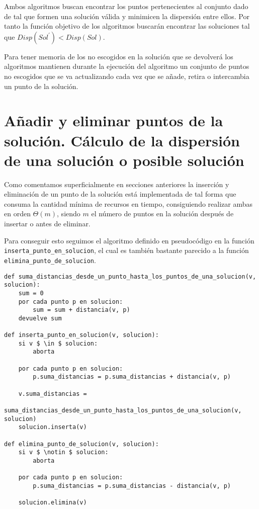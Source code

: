 Ambos algoritmos buscan encontrar los puntos pertenecientes al conjunto dado de tal que formen una solución válida y minimicen la dispersión
entre ellos. Por tanto la función objetivo de los algoritmos buscarán encontrar las soluciones tal que $ Disp(Sol^{\prime}) < Disp(Sol) $.

Para tener memoria de los no escogidos en la solución que se devolverá los algoritmos mantienen durante la ejecución del algoritmo un
conjunto de puntos no escogidos que se va actualizando cada vez que se añade, retira o intercambia un punto de la solución.

\section{Añadir y eliminar puntos de la solución. Cálculo de la dispersión de una solución o posible solución}

Como comentamos superficialmente en secciones anteriores la inserción y eliminación de un punto de la solución está implementada de tal
forma que consuma la cantidad mínima de recursos en tiempo, consiguiendo realizar ambas en orden $ \Theta(m) $, siendo $ m $ el 
número de puntos en la solución después de insertar o antes de eliminar.

Para conseguir esto seguimos el algoritmo definido en pseudocódigo en la función \texttt{inserta\_punto\_en\_solucion}, el cual es también bastante parecido
a la función \texttt{elimina\_punto\_de\_solucion}.

\begin{minipage}{\textwidth}
\begin{lstlisting}[mathescape=true,caption={Definición en pseudocódigo de las funciones que permiten añadir y eliminar puntos a una solución.},captionpos=b]
def suma_distancias_desde_un_punto_hasta_los_puntos_de_una_solucion(v, solucion):
    sum = 0
    por cada punto p en solucion:
        sum = sum + distancia(v, p)
    devuelve sum

def inserta_punto_en_solucion(v, solucion):
    si v $ \in $ solucion:
        aborta

    por cada punto p en solucion:
        p.suma_distancias = p.suma_distancias + distancia(v, p)
    
    v.suma_distancias =
        suma_distancias_desde_un_punto_hasta_los_puntos_de_una_solucion(v, solucion)
    solucion.inserta(v)

def elimina_punto_de_solucion(v, solucion):
    si v $ \notin $ solucion:
        aborta
    
    por cada punto p en solucion:
        p.suma_distancias = p.suma_distancias - distancia(v, p)
    
    solucion.elimina(v)
\end{lstlisting}
\end{minipage}

